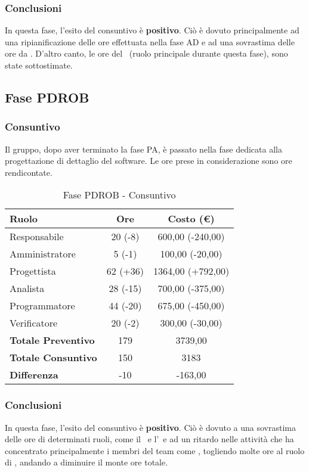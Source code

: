 \documentclass[../PianoProgetto.tex]{subfiles}
\begin{document}
	\subsubsection{Conclusioni}	
     In questa fase, l'esito del consuntivo è \textbf{positivo}. 
     Ciò è dovuto principalmente ad una ripianificazione delle ore effettuata nella fase AD e ad una sovrastima delle ore da \analista. D'altro canto, le ore del \progettista\ (ruolo principale durante questa fase), sono state sottostimate.
     
	\subsection{Fase PDROB}
	\subsubsection{Consuntivo}
	Il gruppo, dopo aver terminato la fase PA, è passato nella fase dedicata alla progettazione di dettaglio del software\g. Le ore prese in considerazione sono ore rendicontate. 
	
	\begin{table}[h]
		\centering
		\begin{tabular}{l * {2}{c}}
			\toprule
			\textbf{Ruolo} & \textbf{Ore} & \textbf{Costo (\euro{})} \\
			\midrule
			Responsabile &		20 (-8) & 600,00  (-240,00) \\
			Amministratore &	5 (-1) & 100,00  (-20,00) \\
			Progettista & 		62 (+36) & 1364,00  (+792,00)\\
			Analista & 			28	(-15)	& 700,00   (-375,00)       \\
			Programmatore & 	44	(-20)	& 675,00 	(-450,00)			\\
			Verificatore & 		20 (-2) & 300,00 (-30,00)	\\
			\midrule
			\textbf{Totale Preventivo} & 179
			& 3739,00
			\\		
			\textbf{Totale Consuntivo} & 150 & 3183 
			\\
			\midrule
			\textbf{Differenza} & -10 & -163,00 \\
			\bottomrule
		\end{tabular}
		
		\caption{Fase PDROB - Consuntivo}
		\label{tab:consuntivoPDROB}
		
	\end{table}		
	
	\subsubsection{Conclusioni}	
     In questa fase, l'esito del consuntivo è \textbf{positivo}. 
     Ciò è dovuto a una sovrastima delle ore di determinati ruoli, come il \responsabilediprogetto\ e l'\analista\, e ad un ritardo nelle attività che ha concentrato principalmente i membri del team come \progettisti, togliendo molte ore al ruolo di \programmatore, andando a diminuire il monte ore totale.
     
\end{document}
